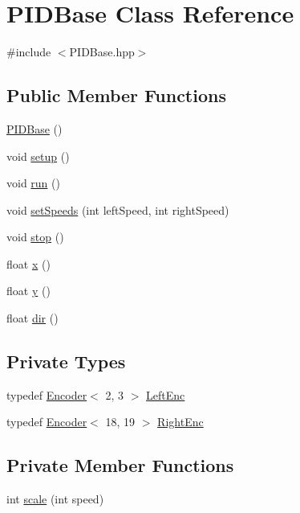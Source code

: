 \hypertarget{classPIDBase}{\section{P\-I\-D\-Base Class Reference}
\label{classPIDBase}
}


{\ttfamily \#include $<$P\-I\-D\-Base.\-hpp$>$}

\subsection*{Public Member Functions}
\begin{DoxyCompactItemize}
\item 
\hyperlink{classPIDBase_a3d1adc8f47087f795979fb5596ea3e7d}{P\-I\-D\-Base} ()
\item 
void \hyperlink{classPIDBase_a326fb682c5a801ed57a98418db7702a4}{setup} ()
\item 
void \hyperlink{classPIDBase_af2accfb7aea58dc4e05d07e095785f23}{run} ()
\item 
void \hyperlink{classPIDBase_ab078b6c0e03b48efc73def33eb1b03e2}{set\-Speeds} (int left\-Speed, int right\-Speed)
\item 
void \hyperlink{classPIDBase_adf5a06686538194d39659ddadc78def6}{stop} ()
\item 
float \hyperlink{classPIDBase_adcec556fd426590a5b05054614344b89}{x} ()
\item 
float \hyperlink{classPIDBase_a9557526e6f2048616cb84ccf65cfe235}{y} ()
\item 
float \hyperlink{classPIDBase_abde01e16704fe190c8eff5bb9bb5f2ae}{dir} ()
\end{DoxyCompactItemize}
\subsection*{Private Types}
\begin{DoxyCompactItemize}
\item 
typedef \hyperlink{classEncoder}{Encoder}$<$ 2, 3 $>$ \hyperlink{classPIDBase_af7a230a127fe585279e6ed264f504d51}{Left\-Enc}
\item 
typedef \hyperlink{classEncoder}{Encoder}$<$ 18, 19 $>$ \hyperlink{classPIDBase_a1b40a4e43b87a65c6d501ccf5789acc3}{Right\-Enc}
\end{DoxyCompactItemize}
\subsection*{Private Member Functions}
\begin{DoxyCompactItemize}
\item 
int \hyperlink{classPIDBase_acf14092bf5bcbc54e8bb717b37524534}{scale} (int speed)
\end{DoxyCompactItemize}
